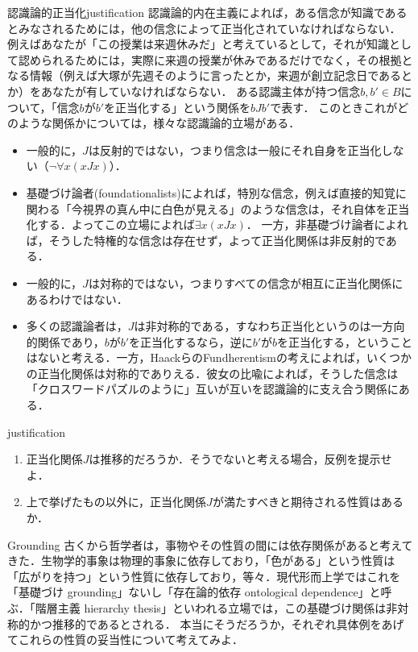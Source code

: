 \documentclass[dvipdfmx, 11pt,a4paper]{jsarticle}
\begin{document}
\begin{rei}{認識論的正当化}{justification}
 認識論的内在主義によれば，ある信念が知識であるとみなされるためには，他の信念によって正当化されていなければならない．
 例えばあなたが「この授業は来週休みだ」と考えているとして，それが知識として認められるためには，実際に来週の授業が休みであるだけでなく，その根拠となる情報（例えば大塚が先週そのように言ったとか，来週が創立記念日であるとか）をあなたが有していなければならない．
 ある認識主体が持つ信念$b, b' \in B$について，「信念$b$が$b'$を正当化する」という関係を$bJb'$で表す．
 このときこれがどのような関係かについては，様々な認識論的立場がある．
 \begin{itemize}
  \item 一般的に，$J$は反射的ではない，つまり信念は一般にそれ自身を正当化しない（$\neg \forall x (xJx)$）．
  \item 基礎づけ論者(foundationalists)によれば，特別な信念，例えば直接的知覚に関わる「今視界の真ん中に白色が見える」のような信念は，それ自体を正当化する．よってこの立場によれば$\exists x (xJx)$．
	一方，非基礎づけ論者によれば，そうした特権的な信念は存在せず，よって正当化関係は非反射的である．
  \item 一般的に，$J$は対称的ではない，つまりすべての信念が相互に正当化関係にあるわけではない．
  \item 多くの認識論者は，$J$は非対称的である，すなわち正当化というのは一方向的関係であり，$b$が$b'$を正当化するなら，逆に$b'$が$b$を正当化する，ということはないと考える．一方，HaackらのFundherentismの考えによれば，いくつかの正当化関係は対称的でありえる．彼女の比喩によれば，そうした信念は「クロスワードパズルのように」互いが互いを認識論的に支え合う関係にある．
 \end{itemize}
\end{rei}

\begin{renshu}{}{justification}
\begin{enumerate}
 \item 正当化関係$J$は推移的だろうか．そうでないと考える場合，反例を提示せよ．
 \item 上で挙げたもの以外に，正当化関係$J$が満たすべきと期待される性質はあるか．
\end{enumerate}
\end{renshu}


\begin{rei}{Grounding}{}
 古くから哲学者は，事物やその性質の間には依存関係があると考えてきた．生物学的事象は物理的事象に依存しており，「色がある」という性質は「広がりを持つ」という性質に依存しており，等々．現代形而上学ではこれを「基礎づけ grounding」ないし「存在論的依存 ontological dependence」と呼ぶ．「階層主義 hierarchy thesis」といわれる立場では，この基礎づけ関係は非対称的かつ推移的であるとされる．
本当にそうだろうか，それぞれ具体例をあげてこれらの性質の妥当性について考えてみよ．
\end{rei}
\end{document}
